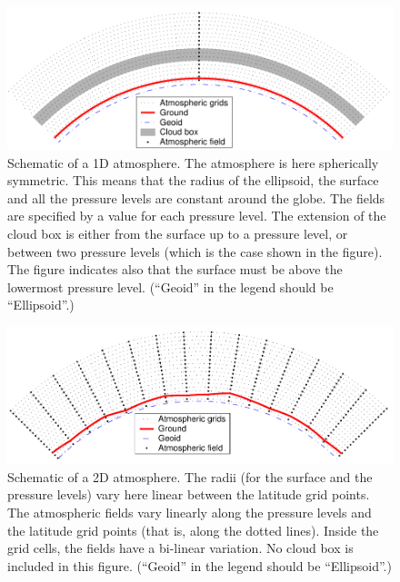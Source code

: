 \begin{figure}
 \begin{center}
  \includegraphics*[width=0.98\hsize]{atm_dim_1d}
  \caption{Schematic of a 1D atmosphere. The atmosphere is 
    here spherically symmetric. This means that the radius of the
    ellipsoid, the surface and all the pressure levels are constant
    around the globe. The fields are specified by a value for each
    pressure level. The extension of the cloud box is either from
    the surface up to a pressure level, or between two pressure
    levels (which is the case shown in the figure). The figure indicates
    also that the surface must be above the lowermost pressure
    level. (``Geoid'' in the legend should be ``Ellipsoid''.)}
  \label{fig:fm_defs:1d}  
 \end{center}
\end{figure}

\begin{figure}
 \begin{center}
  \includegraphics*[width=0.98\hsize]{atm_dim_2d}
  \caption{Schematic of a 2D atmosphere. The radii (for the surface
    and the pressure levels) vary here linear between the latitude
    grid points. The atmospheric fields vary linearly along the
    pressure levels and the latitude grid points (that is, along the
    dotted lines). Inside the grid cells, the fields have a bi-linear
    variation. No cloud box is included in this figure.
    (``Geoid'' in the legend should be ``Ellipsoid''.)}
  \label{fig:fm_defs:2d}
 \end{center}
\end{figure}

